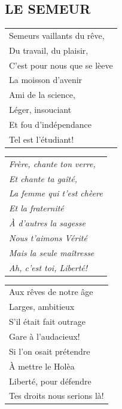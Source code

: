 \documentclass{article}
\begin{document}
\subsection*{LE SEMEUR}
\begin{flushleft}
\begin{tabularx}{0.7\textwidth} {
   >{\raggedright\arraybackslash}X }
Semeurs vaillants du rêve,\\
Du travail, du plaisir,\\
C’est pour nous que se lèeve\\
La moisson d’avenir\\
Ami de la science,\\
Léger, insouciant\\
Et fou d’indépendance\\
Tel est l’étudiant!\\
\end{tabularx}
\end{flushleft}
\begin{flushleft}
\begin{tabularx}{0.7\textwidth} {
   >{\raggedright\arraybackslash}X }
\textit{Frère, chante ton verre,}\\
\textit{Et chante ta gaîté,}\\
\textit{La femme qui t’est chèere}\\
\textit{Et la fraternité}\\
\textit{À d’autres la sagesse}\\
\textit{Nous t’aimons Vérité}\\
\textit{Mais la seule maîtresse}\\
\textit{Ah, c’est toi, Liberté!}\\
\end{tabularx}
\end{flushleft}
\begin{flushleft}
\begin{tabularx}{0.7\textwidth} {
   >{\raggedright\arraybackslash}X }
Aux rêves de notre âge\\
Larges, ambitieux\\
S’il était fait outrage\\
Gare à l’audacieux!\\
Si l’on osait prétendre\\
À mettre le Holèa\\
Liberté, pour défendre\\
Tes droits nous serions là!\\
\end{tabularx}
\end{flushleft}
\end{document}
